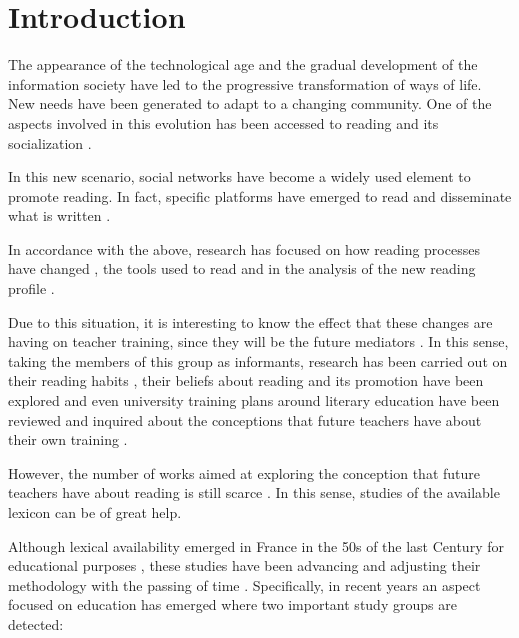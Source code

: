 \documentclass[english]{textolivre}
\begin{document}
\begin{polyabstract}
\begin{portuguese}
\begin{abstract}
\end{abstract}
\end{portuguese}
\end{polyabstract}

\section{Introduction}\label{sec-intro}
The appearance of the technological age and the gradual development of the information society have led to the progressive transformation of ways of life. New needs have been generated to adapt to a changing community. One of the aspects involved in this evolution has been accessed to reading and its socialization \cite{liu_reading_2005,cordon_garcia_socializacion_2023}.

In this new scenario, social networks have become a widely used element to promote reading. In fact, specific platforms have emerged to read and disseminate what is written \cite{mokhtari_impact_2009}.

In accordance with the above, research has focused on how reading processes have changed \cite{diaz_diaz_lectura_2022a}, the tools used to read \cite{alcocer_vazquez_practicas_2021} and in the analysis of the new reading profile \cite{putro_profiles_2018}.

Due to this situation, it is interesting to know the effect that these changes are having on teacher training, since they will be the future mediators \cite{diaz-diaz_lector_2022b}. In this sense, taking the members of this group as informants, research has been carried out on their reading habits \cite{juarez_calvillo_influencia_2019}, their beliefs about reading and its promotion have been explored \cite{diez_mediavilla_preconceptos_2018} and even university training plans around literary education have been reviewed \cite{soto-vazquez_didactica_2022} and inquired about the conceptions that future teachers have about their own training \cite{alvarez-alvarez_como_2019}.

However, the number of works aimed at exploring the conception that future teachers have about reading is still scarce \cite{castillo_fadic_lexico_2020}. In this sense, studies of the available lexicon can be of great help.

Although lexical availability emerged in France in the 50s of the last Century for educational purposes \cite{gougenheim_lelaboration_1956}, these studies have been advancing and adjusting their methodology with the passing of time \cite{herranz_llacer_alisis_2019}. Specifically, in recent years an aspect focused on education has emerged \cite{zambrano_revision_2019} where two important study groups are detected:
\end{document}
